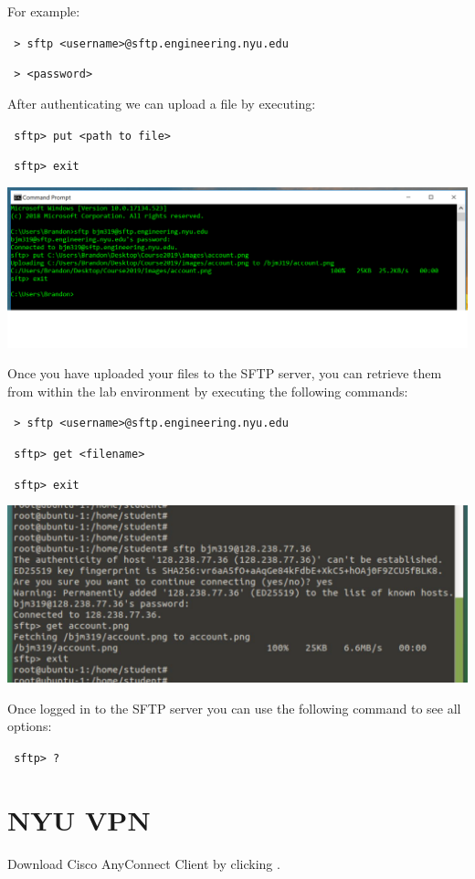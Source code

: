 \documentclass[12pt]{article}
\newcommand{\MYhref}[3][blue]{\href{#2}{\color{#1}{#3}}}%
\begin{document}
For example:

\texttt{
> sftp <username>@sftp.engineering.nyu.edu
}

\texttt{
> <password>
}



After authenticating we can upload a file by executing:

\texttt{
sftp> put <path to file>
}

\texttt{
sftp> exit
}

{%
\centering
\includegraphics[width=\linewidth]{sftp1.png}

}


Once you have uploaded your files to the SFTP server, you can retrieve them from within the lab environment by executing the following commands:

\texttt{
> sftp <username>@sftp.engineering.nyu.edu
}

\texttt{
sftp> get <filename>
}

\texttt{
sftp> exit
}

{%
\centering
\includegraphics[width=\linewidth]{sftp2.png}

}

Once logged in to the SFTP server you can use the following command to see all options:

\texttt{
sftp> ?
}

\newpage

\section*{NYU VPN}
Download Cisco AnyConnect Client by clicking
\MYhref{https://www.cisco.com/c/en/us/support/security/anyconnect-secure-mobility-client/tsd-products-support-series-home.html}{here}.
\end{document}
